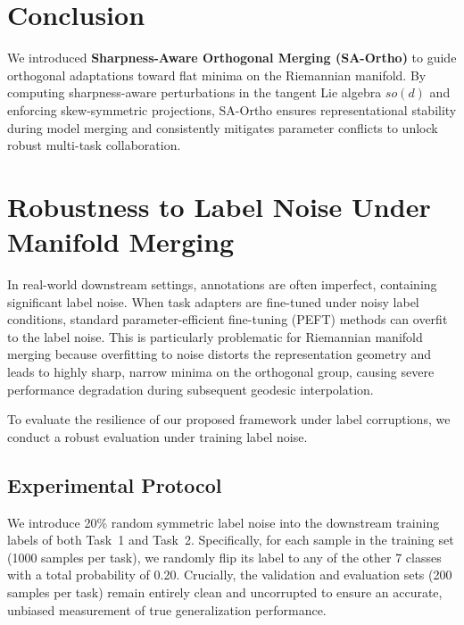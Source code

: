 \documentclass{article}
\theoremstyle{plain}
\theoremstyle{definition}
\theoremstyle{remark}
\begin{document}
\vspace{-12pt}
\section{Conclusion}
\label{submission-conclusion}

We introduced \textbf{Sharpness-Aware Orthogonal Merging (SA-Ortho)} to guide orthogonal adaptations toward flat minima on the Riemannian manifold. By computing sharpness-aware perturbations in the tangent Lie algebra $so(d)$ and enforcing skew-symmetric projections, SA-Ortho ensures representational stability during model merging and consistently mitigates parameter conflicts to unlock robust multi-task collaboration.




\newpage
\appendix
\onecolumn
\section{Robustness to Label Noise Under Manifold Merging}
\label{appendix-label-noise}

In real-world downstream settings, annotations are often imperfect, containing significant label noise. When task adapters are fine-tuned under noisy label conditions, standard parameter-efficient fine-tuning (PEFT) methods can overfit to the label noise. This is particularly problematic for Riemannian manifold merging because overfitting to noise distorts the representation geometry and leads to highly sharp, narrow minima on the orthogonal group, causing severe performance degradation during subsequent geodesic interpolation.

To evaluate the resilience of our proposed framework under label corruptions, we conduct a robust evaluation under training label noise.

\subsection{Experimental Protocol}
We introduce 20\% random symmetric label noise into the downstream training labels of both Task~1 and Task~2. Specifically, for each sample in the training set (1000 samples per task), we randomly flip its label to any of the other 7 classes with a total probability of 0.20. Crucially, the validation and evaluation sets (200 samples per task) remain entirely clean and uncorrupted to ensure an accurate, unbiased measurement of true generalization performance.
\end{document}
